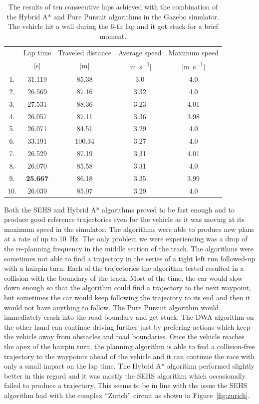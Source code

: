 \begin{table}
	\centering
	\begin{tabular}{c c c c c}
		\toprule
		& Lap time & Traveled distance  & Average speed & Maximum speed             \\
		& [\si{\second}] & [\si{\meter}]      & [\si{\meter\per\second}]  & [\si{\meter\per\second}]  \\
		\midrule
		1. & 31.119 & 85.38 & 3.0 & 4.0 \\
		2. & 26.569 & 87.16 & 3.32 & 4.0 \\
		3. & 27.531 & 88.36 & 3.23 & 4.01 \\
		4. & 26.057 & 87.11 & 3.36 & 3.98 \\
		5. & 26.071 & 84.51 & 3.29 & 4.0 \\
		6. & 33.191 & 100.34 & 3.27 & 4.0 \\
		7. & 26.529 & 87.19 & 3.31 & 4.01 \\
		8. & 26.070 & 85.58 & 3.31 & 4.0 \\
		9. & \bfseries 25.667 & 86.18 & 3.35 & 3.99 \\
		10. & 26.039 & 85.07 & 3.29 & 4.0 \\
		\bottomrule
	\end{tabular}
	\caption{The results of ten consecutive laps achieved with the combination of the Hybrid A* and Pure Pursuit algorithms in the Gazebo simulator. The vehicle hit a wall during the 6-th lap and it got stuck for a brief moment.}
	\label{tbl:pure-pursuit-hybrid-astar}
\end{table}

Both the \gls{SEHS} and Hybrid A* algorithms proved to be fast enough and to produce good reference trajectories even for the vehicle as it was moving at its maximum speed in the simulator. The algorithms were able to produce new plans at a rate of up to \SI{10}{\hertz}. The only problem we were experiencing was a drop of the re-planning frequency in the middle section of the track. The algorithms were sometimes not able to find a trajectory in the series of a tight left run followed-up with a hairpin turn. Each of the trajectories the algorithm tested resulted in a collision with the boundary of the track. Most of the time, the car would slow down enough so that the algorithm could find a trajectory to the next waypoint, but sometimes the car would keep following the trajectory to its end and then it would not have anything to follow. The Pure Pursuit algorithm would immediately crash into the road boundary and get stuck. The \gls*{DWA} algorithm on the other hand can continue driving further just by prefering actions which keep the vehicle away from obstacles and road boundaries. Once the vehicle reaches the apex of the hairpin turn, the planning algorithm is able to find a collision-free trajectory to the waypoints ahead of the vehicle and it can continue the race with only a small impact on the lap time. The Hybrid A* algorithm performed slightly better in this regard and it was mostly the \gls*{SEHS} algorithm which occasionally failed to produce a trajectory. This seems to be in line with the issue the \gls*{SEHS} algorithm had with the complex ``Zurich'' circuit as shown in Figure~\ref{fig:zurich}.

